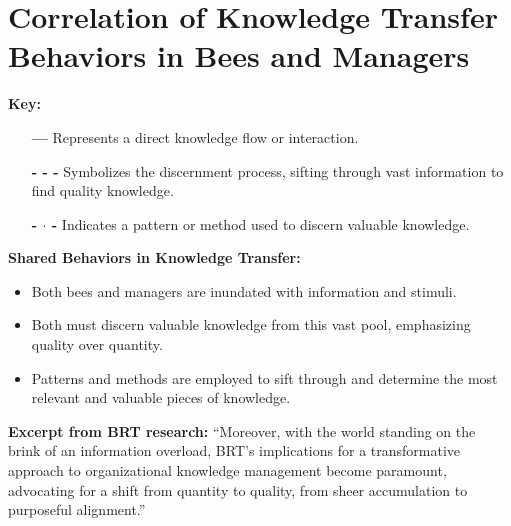 \documentclass{article}
\begin{document}
\section*{Correlation of Knowledge Transfer Behaviors in Bees and Managers}




\vspace{1cm}

\textbf{Key:}
\begin{itemize}
    \item[\textbf{---}] Represents a direct knowledge flow or interaction.
    \item[\textbf{- - -}] Symbolizes the discernment process, sifting through vast information to find quality knowledge.
    \item[\textbf{- $\cdot$ -}] Indicates a pattern or method used to discern valuable knowledge.
\end{itemize}

\vspace{1cm}

\textbf{Shared Behaviors in Knowledge Transfer:}
\begin{itemize}
    \item Both bees and managers are inundated with information and stimuli.
    \item Both must discern valuable knowledge from this vast pool, emphasizing quality over quantity.
    \item Patterns and methods are employed to sift through and determine the most relevant and valuable pieces of knowledge.
\end{itemize}

\vspace{1cm}

\textbf{Excerpt from BRT research:} 
``Moreover, with the world standing on the brink of an information overload, BRT's implications for a transformative approach to organizational knowledge management become paramount, advocating for a shift from quantity to quality, from sheer accumulation to purposeful alignment.''
\end{document}
